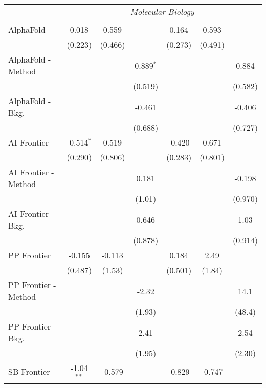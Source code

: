 \begin{tabular}{lcccccc}
 & \multicolumn{6}{c}{\textit{Molecular Biology}} \\ \\
   AlphaFold            & 0.018        & 0.559   &             & 0.164   & 0.593   &   \\   
                        & (0.223)      & (0.466) &             & (0.273) & (0.491) &   \\   
   AlphaFold - Method   &              &         & 0.889$^{*}$ &         &         & 0.884\\   
                        &              &         & (0.519)     &         &         & (0.582)\\   
   AlphaFold - Bkg.     &              &         & -0.461      &         &         & -0.406\\   
                        &              &         & (0.688)     &         &         & (0.727)\\   
   AI Frontier          & -0.514$^{*}$ & 0.519   &             & -0.420  & 0.671   &   \\   
                        & (0.290)      & (0.806) &             & (0.283) & (0.801) &   \\   
   AI Frontier - Method &              &         & 0.181       &         &         & -0.198\\   
                        &              &         & (1.01)      &         &         & (0.970)\\   
   AI Frontier - Bkg.   &              &         & 0.646       &         &         & 1.03\\   
                        &              &         & (0.878)     &         &         & (0.914)\\   
   PP Frontier          & -0.155       & -0.113  &             & 0.184   & 2.49    &   \\   
                        & (0.487)      & (1.53)  &             & (0.501) & (1.84)  &   \\   
   PP Frontier - Method &              &         & -2.32       &         &         & 14.1\\   
                        &              &         & (1.93)      &         &         & (48.4)\\   
   PP Frontier - Bkg.   &              &         & 2.41        &         &         & 2.54\\   
                        &              &         & (1.95)      &         &         & (2.30)\\   
   SB Frontier          & -1.04$^{**}$ & -0.579  &             & -0.829  & -0.747  &   \\   

\end{tabular}
